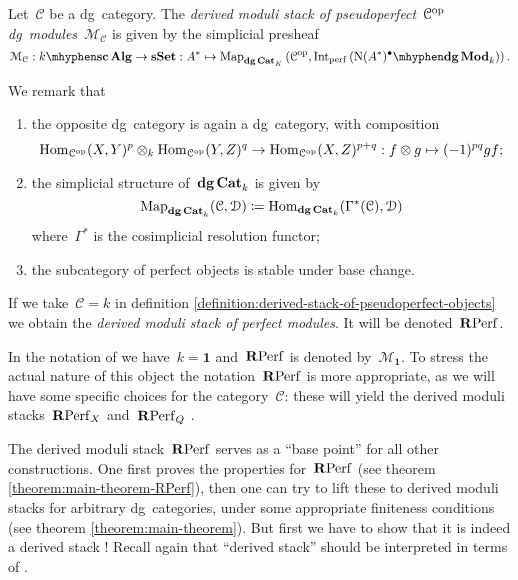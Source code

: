 \begin{refsection}
\begin{definition}
  \label{definition:derived-stack-of-pseudoperfect-objects}
  Let~$\mathcal{C}$ be a dg~category. The \emph{derived moduli stack of pseudoperfect~$\mathcal{C}^{\mathrm{op}}$\dash dg~modules}~$\mathcal{M}_{\mathcal{C}}$ is given by the simplicial presheaf
  \begin{equation}
    \mathcal{M}_{\mathcal{C}}:\scAlg{k}\to\sSet:A^*\mapsto\Map_{\dgCat_K}\left( \mathcal{C}^\opp,\Int_\perf\left( \dgMod{\nerve(A^*)^\bullet}_k \right) \right).
  \end{equation}
\end{definition}

We remark that
\begin{enumerate}
  \item the opposite dg~category is again a dg~category, with composition
    \begin{equation}
      \mathrm{Hom}_{\mathcal{C}^{\mathrm{op}}}(X,Y)^p\otimes_k\mathrm{Hom}_{\mathcal{C}^{\mathrm{op}}}(Y,Z)^q\to\mathrm{Hom}_{\mathcal{C}^{\mathrm{op}}}(X,Z)^{p+q}:f\otimes g\mapsto(-1)^{pq}gf;
    \end{equation}
  \item the simplicial structure of~$\mathbf{dg\,Cat}_k$ is given by
    \begin{equation}
      \operatorname{\mathrm{Map}}_{\mathbf{dg\,Cat}_k}(\mathcal{C},\mathcal{D})\coloneqq\mathrm{Hom}_{\mathbf{dg\,Cat}_k}(\Gamma^*(\mathcal{C}),\mathcal{D})
    \end{equation}
    where~$\Gamma^*$ is the cosimplicial resolution functor;
  \item the subcategory of perfect objects is stable under base change.
\end{enumerate}

\begin{definition}
  If we take~$\mathcal{C}=k$ in definition \ref{definition:derived-stack-of-pseudoperfect-objects} we obtain the \emph{derived moduli stack of perfect modules}. It will be denoted~$\mathbf{R}\mathrm{Perf}$.
\end{definition}

In the notation of \cite{toen-vaquie} we have~$k=\mathbf{1}$ and~$\mathbf{R}\mathrm{Perf}$ is denoted by~$\mathcal{M}_{\mathbf{1}}$. To stress the actual nature of this object the notation~$\mathbf{R}\mathrm{Perf}$ is more appropriate, as we will have some specific choices for the category~$\mathcal{C}$: these will yield the derived moduli stacks~$\mathbf{R}\mathrm{Perf}_X$ and~$\mathbf{R}\mathrm{Perf}_Q$ \cite[section 3.5]{toen-vaquie}.

The derived moduli stack~$\mathbf{R}\mathrm{Perf}$ serves as a ``base point'' for all other constructions. One first proves the properties for~$\mathbf{R}\mathrm{Perf}$ (see theorem \ref{theorem:main-theorem-RPerf}), then one can try to lift these to derived moduli stacks for arbitrary dg~categories, under some appropriate finiteness conditions (see theorem \ref{theorem:main-theorem}). But first we have to show that it is indeed a derived stack \cite[lemma 3.1]{toen-vaquie}! Recall again that ``derived stack'' should be interpreted in terms of \cite[definition 1.3.2.1]{hagII}.


\end{refsection}
